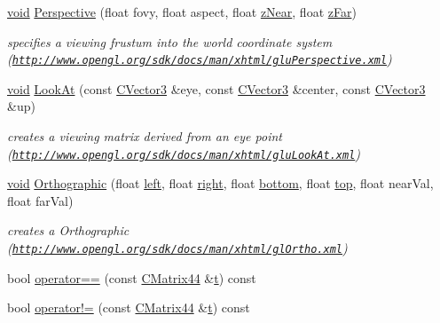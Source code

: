 \begin{DoxyCompactItemize}
\hyperlink{glu_8h_a4292190e3f1f6b373a760c7d9316ad3c}{void} \hyperlink{class_c_matrix44_a7af596a54cb4e3163915ca1b66a3d0b5}{Perspective} (float fovy, float aspect, float \hyperlink{glext_8h_a12d99226e590bbaaf0be69169eeb4834}{z\-Near}, float \hyperlink{glext_8h_a18a2583fe65967bceff8903e2769f8e2}{z\-Far})
\begin{DoxyCompactList}\small\item\em specifies a viewing frustum into the world coordinate system (\href{http://www.opengl.org/sdk/docs/man/xhtml/gluPerspective.xml}{\tt http\-://www.\-opengl.\-org/sdk/docs/man/xhtml/glu\-Perspective.\-xml}) \end{DoxyCompactList}\item 
\hyperlink{glu_8h_a4292190e3f1f6b373a760c7d9316ad3c}{void} \hyperlink{class_c_matrix44_a4f3c80947a24bb83d74ad17c01bea491}{Look\-At} (const \hyperlink{class_c_vector3}{C\-Vector3} \&eye, const \hyperlink{class_c_vector3}{C\-Vector3} \&center, const \hyperlink{class_c_vector3}{C\-Vector3} \&up)
\begin{DoxyCompactList}\small\item\em creates a viewing matrix derived from an eye point (\href{http://www.opengl.org/sdk/docs/man/xhtml/gluLookAt.xml}{\tt http\-://www.\-opengl.\-org/sdk/docs/man/xhtml/glu\-Look\-At.\-xml}) \end{DoxyCompactList}\item 
\hyperlink{glu_8h_a4292190e3f1f6b373a760c7d9316ad3c}{void} \hyperlink{class_c_matrix44_ae378f7ef8a3a121bd598329b23f271fb}{Orthographic} (float \hyperlink{glext_8h_a85b8f6c07fbc1fb5d77c2ae090f21995}{left}, float \hyperlink{glext_8h_a5ffadbbacc6b89cf6218bc43b384d3fe}{right}, float \hyperlink{glext_8h_a95fc257e5ddf46f7db9d5e898cdf1991}{bottom}, float \hyperlink{glext_8h_a5ab323daeacf8dfdb8f91132fecdca23}{top}, float near\-Val, float far\-Val)
\begin{DoxyCompactList}\small\item\em creates a Orthographic (\href{http://www.opengl.org/sdk/docs/man/xhtml/glOrtho.xml}{\tt http\-://www.\-opengl.\-org/sdk/docs/man/xhtml/gl\-Ortho.\-xml}) \end{DoxyCompactList}\item 
bool \hyperlink{class_c_matrix44_ae4d2eb3a41998637b2f1bd02e3b7b0cc}{operator==} (const \hyperlink{class_c_matrix44}{C\-Matrix44} \&\hyperlink{gl_8h_a00140d6f5c548b26daf170bf16e86a6d}{t}) const 
\item 
bool \hyperlink{class_c_matrix44_a7a652abf026c230ae3a03781070d5360}{operator!=} (const \hyperlink{class_c_matrix44}{C\-Matrix44} \&\hyperlink{gl_8h_a00140d6f5c548b26daf170bf16e86a6d}{t}) const 
\end{DoxyCompactItemize}
